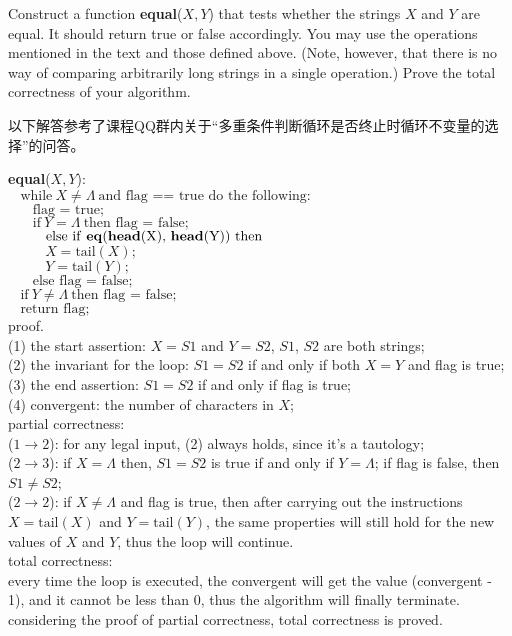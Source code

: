 \documentclass[11pt, a4paper, UTF8]{ctexart}
\begin{document}
\begin{problem}[DH: 5.9]
  Construct a function \textbf{equal}($X, Y$) that tests whether the strings 
  $X$ and $Y$ are equal. It should return true or false accordingly. You may 
  use the operations mentioned in the text and those defined above. (Note, 
  however, that there is no way of comparing arbitrarily long strings in a 
  single operation.) Prove the total correctness of your algorithm.
\end{problem}

\begin{remark}
  以下解答参考了课程QQ群内关于“多重条件判断循环是否终止时循环不变量的选择”的问答。
\end{remark}

\begin{solution}
  \textbf{equal}($X, Y$):\\
  $~~~~\text{while}~X \neq \Lambda~\text{and flag == true do the following:}$\\
  $~~~~~~~~\text{flag = true;}$\\
  $~~~~~~~~\text{if}~Y = \Lambda~\text{then flag = false;}$\\
  $~~~~~~~~\text{else if \textbf{eq}(\textbf{head}(X), \textbf{head}(Y)) then}$\\
  $~~~~~~~~~~~~X = \text{tail}(X);$\\
  $~~~~~~~~~~~~Y = \text{tail}(Y);$\\
  $~~~~~~~~\text{else flag = false;}$\\
  $~~~~\text{if}~Y \neq \Lambda~\text{then flag = false;}$\\
  $~~~~\text{return flag;}$\\
  proof.\\
  (1) the start assertion: $X = S1$ and $Y = S2$, $S1$, $S2$ are both strings;\\
  (2) the invariant for the loop: $S1 = S2$ if and only if both $X = Y$ and 
  flag is true;\\
  (3) the end assertion: $S1 = S2$ if and only if flag is true;\\
  (4) convergent: the number of characters in $X$;\\
  partial correctness:\\
  ($1 \rightarrow 2$): for any legal input, (2) always holds, since it's a tautology;\\
  ($2 \rightarrow 3$): if $X = \Lambda$ then, $S1 = S2$ is true if and only if 
  $Y = \Lambda$; if flag is false, then $S1 \neq S2$;\\
  ($2 \rightarrow 2$): if $X \neq \Lambda$ and flag is true, then after carrying 
  out the instructions $X = \text{tail}(X)$ and $Y = \text{tail}(Y)$, the same 
  properties will still hold for the new values of $X$ and $Y$, thus the loop 
  will continue.\\
  total correctness:\\
  every time the loop is executed, the convergent will get the value (convergent - 1), 
  and it cannot be less than 0, thus the algorithm will finally terminate.\\
  considering the proof of partial correctness, total correctness is proved.
\end{solution}
\end{document}
